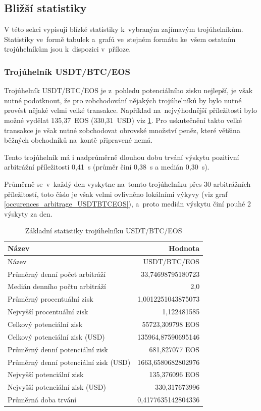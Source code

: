 \documentclass[thesis=B,czech]{FITthesis}[2019/03/21]
\begin{document}
\subsection{Bližší statistiky}
V této sekci vypisuji blízké statistiky k~vybraným zajímavým trojúhelníkům. Statistiky ve~formě tabulek a~grafů ve~stejném formátu ke~všem ostatním trojúhelníkům jsou k~dispozici v~příloze.



\subsubsection{Trojúhelník USDT/BTC/EOS}
Trojúhelník USDT/BTC/EOS je z~pohledu potenciálního zisku nejlepší, je však nutné podotknout, že pro zobchodování nějakých trojúhelníků by bylo nutné provést nějaké velmi velké transakce. Například na~nejvýhodnější příležitosti bylo možné vydělat 135,37~EOS (330,31~USD) viz \ref{USDTBTCEOS_stats}. Pro uskutečnění takto velké transakce je však nutné zobchodovat obrovské množství peněz, které většina běžných obchodníků na~kontě připravené nemá.

Tento trojúhelník má i nadprůměrně dlouhou dobu trvání výskytu pozitivní arbitrážní příležitosti 0,41~s (průměr činí 0,38~s a medián 0,30~s). 

Průměrně se~v~každý den vyskytne na~tomto trojúhelníku přes 30 arbitrážních příležitostí, toto číslo je však velmi ovlivněno lokálními výkyvy (viz graf \ref{occurences_arbitrage_USDTBTCEOS}), a~proto medián výskytu činí pouhé 2 výskyty za den.

\begin{table}\centering
\caption{Základní statistiky trojúhelníku USDT/BTC/EOS}
\label{USDTBTCEOS_stats}
\begin{tabular}{|| l | r ||}
\hline Název & Hodnota \\ 
\hline\hline Název & USDT/BTC/EOS \\ 
\hline Průměrný denní počet arbitráží & 33,74698795180723 \\ 
\hline Medián denního počtu arbitráží & 2,0 \\ 
\hline Průměrný procentuální zisk & 1,0012251043875073 \\ 
\hline Nejvyšší procentuální zisk & 1,122481585 \\ 
\hline Celkový potenciální zisk & 55723,309798 EOS \\ 
\hline Celkový potenciální zisk (USD) & 135964,87590695146 \\ 
\hline Průměrný denní potenciální zisk & 681,827077 EOS \\ 
\hline Průměrný denní potenciální zisk (USD) & 1663,6580682802976 \\ 
\hline Nejvyšší potenciální zisk & 135,376096 EOS \\ 
\hline Nejvyšší potenciální zisk (USD) & 330,317673996 \\ 
\hline Průměrná doba trvání & 0,4177635142804336 \\ 
\hline
\end{tabular}
\end{table}
\end{document}
